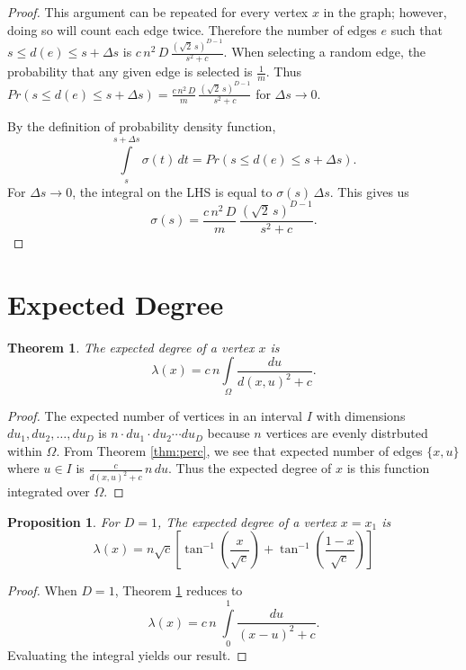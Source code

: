 \documentclass[a4paper,10pt]{article}
\newtheorem{prop}{Proposition}
\newtheorem{theorem}{Theorem}
\begin{document}
\begin{proof}
This argument can be repeated for every vertex $x$ in the graph; however, doing so will count each edge twice. Therefore the number of edges $e$ such that $s \leq d(e) \leq s + \Delta s$ is $c \,n^2\,D\,\frac{(\sqrt{2}\,s)^{D - 1}}{s^2 + c}$. When selecting a random edge, the probability that any given edge is selected is $\frac{1}{m}$. Thus $Pr(s \leq d(e) \leq s + \Delta s) = \frac{c \,n^2\,D}{m}\,\frac{(\sqrt{2}\,s)^{D - 1}}{s^2 + c}$ for $\Delta s \to 0.$

By the definition of probability density function, 
\begin{equation}
 \int\limits_{s}^{s + \Delta s} \sigma(t)\,dt = Pr(s \leq d(e) \leq s + \Delta s).
\end{equation}
For $\Delta s \to 0$, the integral on the LHS is equal to $\sigma(s) \, \Delta s$. This gives us
 \begin{equation}
  \sigma(s) = \frac{c \,n^2\,D}{m}\,\frac{(\sqrt{2}\,s)^{D - 1}}{s^2 + c}.
 \end{equation}
\end{proof}

\section{Expected Degree}
\begin{theorem}
\label{thm:lambdax}
The expected degree of a vertex $x$ is
 \begin{equation}
 \lambda(x) = c\,n\int\limits_\Omega \frac{du}{d(x, u)^2 + c}.
\end{equation}
\end{theorem}
\begin{proof}
The expected number of vertices in an interval $I$ with dimensions $du_1, du_2, \ldots, du_D$  is $n \cdot du_1 \cdot du_2 \cdots du_D$ because $n$ vertices are evenly distrbuted within $\Omega$. From Theorem \ref{thm:perc}, we see that expected number of edges $\{x, u\}$ where $u \in I$ is $\frac{c}{d(x, u)^2 + c} \, n \, du$. Thus the expected degree of $x$ is this function integrated over $\Omega$.
\end{proof}

\begin{prop}
\label{prop:lambdax1}
For $D = 1$, The expected degree of a vertex $x = x_1$ is
 \begin{equation}
 \lambda(x) = n\sqrt{c}\left[\tan^{-1}\left(\frac{x}{\sqrt{c}}\right)+\tan^{-1}\left(\frac{1-x}{\sqrt{c}}\right)\right]
\end{equation}
\end{prop}
\begin{proof}
When $D=1$, Theorem \ref{thm:lambdax} reduces to
\begin{equation}
 \lambda(x) = c\,n\;\int\limits_{0}^{1} \frac{du}{(x - u)^2 + c}.
\end{equation}
Evaluating the integral yields our result.
\end{proof}
\end{document}
